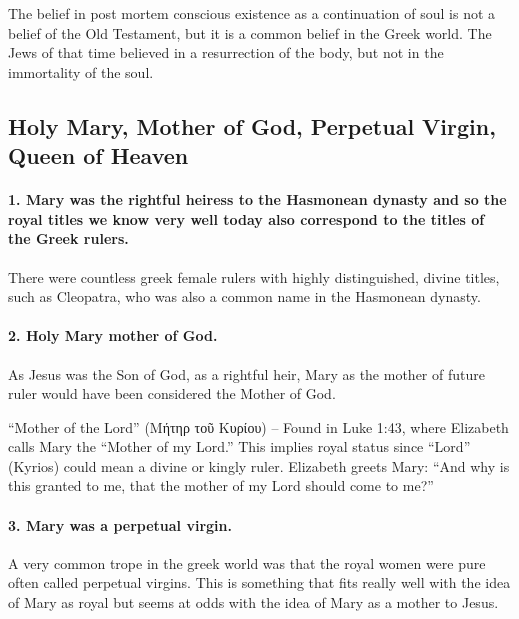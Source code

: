 The belief in post mortem conscious existence as a continuation of soul is not a belief of the Old Testament, but it is a common belief in the Greek world.
The Jews of that time believed in a resurrection of the body, but not in the immortality of the soul.

\subsection{Holy Mary, Mother of God, Perpetual Virgin, Queen of Heaven}\label{subsec:holy-mary-mother-of-god-perpetual-virgin-queen-of-heaven}

\paragraph{1.
Mary was the rightful heiress to the Hasmonean dynasty and so the royal titles we know very well today also correspond to the titles of the Greek rulers.}\label{par:mary-was-the-rightful-heiress-to-the-hasmonean-dynasty-and-so-the-royal-titles-we-know-very-well-today-also-correspond-to-the-titles-of-the-greek-rulers.}

There were countless greek female rulers with highly distinguished, divine titles, such as Cleopatra, who was also a common name in the Hasmonean dynasty.

\paragraph{2.
Holy Mary mother of God.}\label{par:holy-mary-mother-of-god.}

As Jesus was the Son of God, as a rightful heir, Mary as the mother of future ruler would have been considered the Mother of God.

``Mother of the Lord'' (Μήτηρ τοῦ Κυρίου) -- Found in Luke 1:43, where Elizabeth calls Mary the ``Mother of my Lord.'' This implies royal status since ``Lord'' (Kyrios) could mean a divine or kingly ruler.
Elizabeth greets Mary: ``And why is this granted to me, that the mother of my Lord should come to me?''

\paragraph{3.
Mary was a perpetual virgin.}\label{par:mary-was-a-perpetual-virgin.}

A very common trope in the greek world was that the royal women were pure often called perpetual virgins.
This is something that fits really well with the idea of Mary as royal but seems at odds with the idea of Mary as a mother to Jesus.

